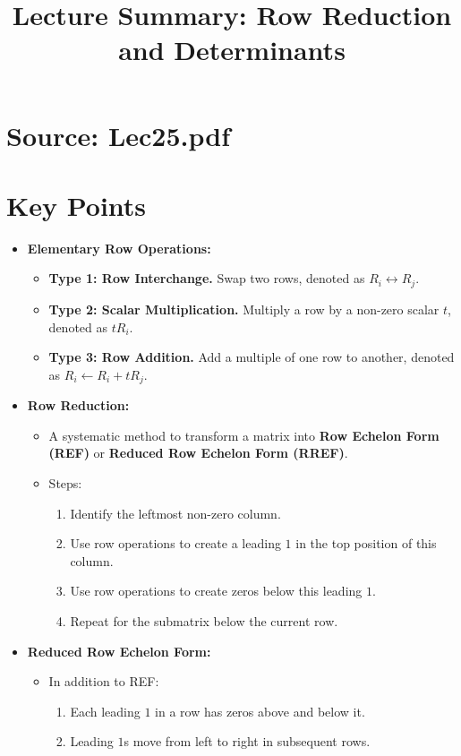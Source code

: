 \documentclass{article}
\title{Lecture Summary: Row Reduction and Determinants}
\author{}
\date{}
\begin{document}
\maketitle

\section*{Source: Lec25.pdf}

\section*{Key Points}

\begin{itemize}
  \item \textbf{Elementary Row Operations:}
    \begin{itemize}
      \item \textbf{Type 1: Row Interchange.} Swap two rows, denoted as $R_i \leftrightarrow R_j$.
      \item \textbf{Type 2: Scalar Multiplication.} Multiply a row by a non-zero scalar $t$, denoted as $tR_i$.
      \item \textbf{Type 3: Row Addition.} Add a multiple of one row to another, denoted as $R_i \leftarrow R_i + tR_j$.
    \end{itemize}

  \item \textbf{Row Reduction:}
    \begin{itemize}
      \item A systematic method to transform a matrix into \textbf{Row Echelon Form (REF)} or \textbf{Reduced Row Echelon Form (RREF)}.
      \item Steps:
        \begin{enumerate}
          \item Identify the leftmost non-zero column.
          \item Use row operations to create a leading $1$ in the top position of this column.
          \item Use row operations to create zeros below this leading $1$.
          \item Repeat for the submatrix below the current row.
        \end{enumerate}
    \end{itemize}

  \item \textbf{Reduced Row Echelon Form:}
    \begin{itemize}
      \item In addition to REF:
        \begin{enumerate}
          \item Each leading $1$ in a row has zeros above and below it.
          \item Leading $1$s move from left to right in subsequent rows.
        \end{enumerate}
    \end{itemize}


\end{itemize}
\end{document}
